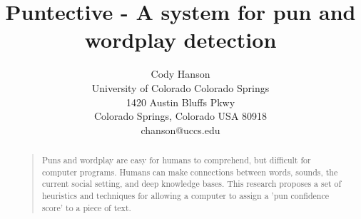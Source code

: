 \documentclass[letterpaper]{article}
\begin{document}
\title{Puntective - A system for pun and wordplay detection}
\author{Cody Hanson\\
University of Colorado Colorado Springs\\
1420 Austin Bluffs Pkwy\\
Colorado Springs, Colorado USA 80918\\
chanson@uccs.edu}
\maketitle
\begin{abstract}
\begin{quote}
Puns and wordplay are easy for humans to comprehend, but difficult for computer programs.
Humans can make connections between words, sounds, the current social setting, and deep knowledge bases. 
This research proposes a set of heuristics and techniques for allowing a computer to assign a 'pun confidence score' to a piece of text.
\end{quote}
\end{abstract}







 

\end{document}
